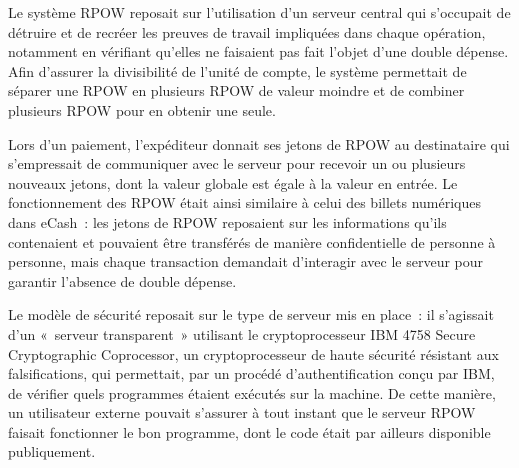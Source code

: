 Le système RPOW reposait sur l'utilisation d'un serveur central qui s'occupait de détruire et de recréer les preuves de travail impliquées dans chaque opération, notamment en vérifiant qu'elles ne faisaient pas fait l'objet d'une double dépense. Afin d'assurer la divisibilité de l'unité de compte, le système permettait de séparer une RPOW en plusieurs RPOW de valeur moindre et de combiner plusieurs RPOW pour en obtenir une seule.

Lors d'un paiement, l'expéditeur donnait ses jetons de RPOW au destinataire qui s'empressait de communiquer avec le serveur pour recevoir un ou plusieurs nouveaux jetons, dont la valeur globale est égale à la valeur en entrée. Le fonctionnement des RPOW était ainsi similaire à celui des billets numériques dans eCash~: les jetons de RPOW reposaient sur les informations qu'ils contenaient et pouvaient être transférés de manière confidentielle de personne à personne, mais chaque transaction demandait d'interagir avec le serveur pour garantir l'absence de double dépense.

Le modèle de sécurité reposait sur le type de serveur mis en place~: il s'agissait d'un «~serveur transparent~» utilisant le cryptoprocesseur IBM 4758 Secure Cryptographic Coprocessor, un cryptoprocesseur de haute sécurité résistant aux falsifications, qui permettait, par un procédé d'authentification conçu par IBM, de vérifier quels programmes étaient exécutés sur la machine. De cette manière, un utilisateur externe pouvait s'assurer à tout instant que le serveur RPOW faisait fonctionner le bon programme, dont le code était par ailleurs disponible publiquement.

